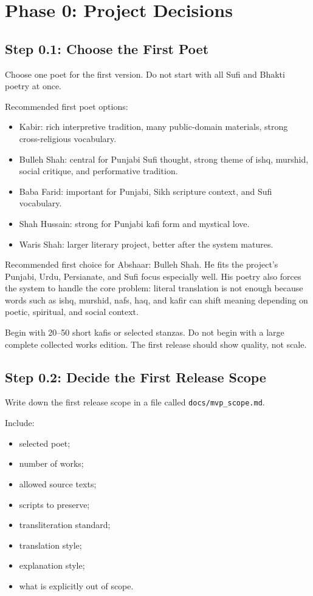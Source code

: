 \documentclass[11pt]{article}
\begin{document}
\section{Phase 0: Project Decisions}

\subsection{Step 0.1: Choose the First Poet}

Choose one poet for the first version. Do not start with all Sufi and Bhakti
poetry at once.

Recommended first poet options:

\begin{itemize}
  \item Kabir: rich interpretive tradition, many public-domain materials, strong
  cross-religious vocabulary.
  \item Bulleh Shah: central for Punjabi Sufi thought, strong theme of ishq,
  murshid, social critique, and performative tradition.
  \item Baba Farid: important for Punjabi, Sikh scripture context, and Sufi
  vocabulary.
  \item Shah Hussain: strong for Punjabi kafi form and mystical love.
  \item Waris Shah: larger literary project, better after the system matures.
\end{itemize}

Recommended first choice for Abshaar: Bulleh Shah. He fits the project's Punjabi,
Urdu, Persianate, and Sufi focus especially well. His poetry also forces the
system to handle the core problem: literal translation is not enough because
words such as ishq, murshid, nafs, haq, and kafir can shift meaning depending on
poetic, spiritual, and social context.

Begin with 20--50 short kafis or selected stanzas. Do not begin with a large
complete collected works edition. The first release should show quality, not
scale.

\subsection{Step 0.2: Decide the First Release Scope}

Write down the first release scope in a file called \verb|docs/mvp_scope.md|.

Include:

\begin{itemize}
  \item selected poet;
  \item number of works;
  \item allowed source texts;
  \item scripts to preserve;
  \item transliteration standard;
  \item translation style;
  \item explanation style;
  \item what is explicitly out of scope.
\end{itemize}
\end{document}
